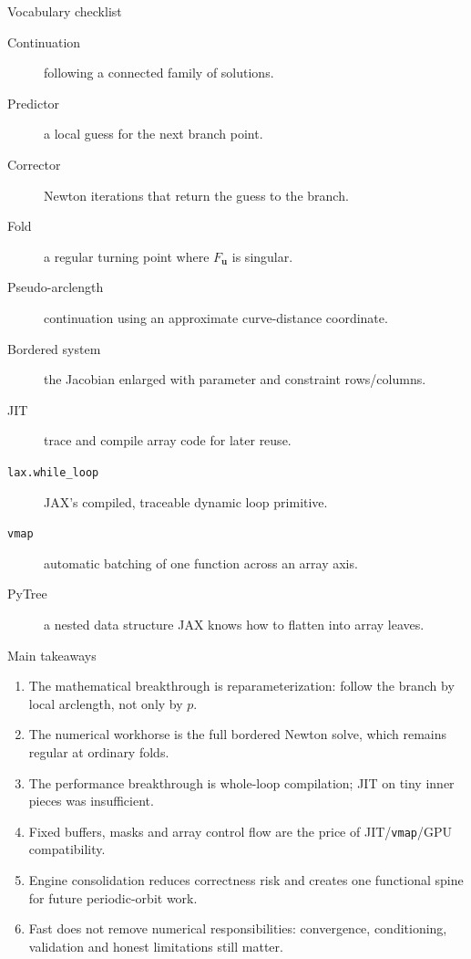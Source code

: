 \documentclass[aspectratio=169,10pt]{beamer}
\newcommand{\state}{\bm{u}}
\begin{document}
\begin{frame}{Vocabulary checklist}
\begin{description}
  \item[Continuation] following a connected family of solutions.
  \item[Predictor] a local guess for the next branch point.
  \item[Corrector] Newton iterations that return the guess to the branch.
  \item[Fold] a regular turning point where $F_{\state}$ is singular.
  \item[Pseudo-arclength] continuation using an approximate curve-distance coordinate.
  \item[Bordered system] the Jacobian enlarged with parameter and constraint rows/columns.
  \item[JIT] trace and compile array code for later reuse.
  \item[\texttt{lax.while\_loop}] JAX's compiled, traceable dynamic loop primitive.
  \item[\texttt{vmap}] automatic batching of one function across an array axis.
  \item[PyTree] a nested data structure JAX knows how to flatten into array leaves.
\end{description}
\end{frame}

\begin{frame}{Main takeaways}
\begin{enumerate}
  \item The mathematical breakthrough is reparameterization: follow the branch by local arclength, not only by $p$.
  \item The numerical workhorse is the full bordered Newton solve, which remains regular at ordinary folds.
  \item The performance breakthrough is whole-loop compilation; JIT on tiny inner pieces was insufficient.
  \item Fixed buffers, masks and array control flow are the price of JIT/\texttt{vmap}/GPU compatibility.
  \item Engine consolidation reduces correctness risk and creates one functional spine for future periodic-orbit work.
  \item Fast does not remove numerical responsibilities: convergence, conditioning, validation and honest limitations still matter.
\end{enumerate}
\end{frame}
\end{document}
